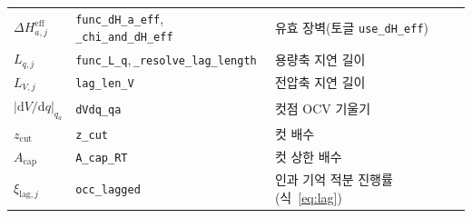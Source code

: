 \documentclass[11pt,a4paper]{article}
\newcommand{\dd}{\mathrm{d}}
\newcommand{\eff}{\mathrm{eff}}
\newcommand{\code}[1]{\texttt{#1}}
\begin{document}
\begin{longtable}{p{} p{} p{}}
$\Delta H_{a,j}^\eff$ & \code{func\_dH\_a\_eff},\,\code{\_chi\_and\_dH\_eff} & 유효 장벽(토글 \code{use\_dH\_eff}) \\
$L_{q,j}$ & \code{func\_L\_q},\,\code{\_resolve\_lag\_length} & 용량축 지연 길이 \\
$L_{V,j}$ & \code{lag\_len\_V} & 전압축 지연 길이 \\
$|\dd V/\dd q|_{q_a}$ & \code{dVdq\_qa} & 컷점 OCV 기울기 \\
$z_\mathrm{cut}$ & \code{z\_cut} & 컷 배수 \\
$A_\mathrm{cap}$ & \code{A\_cap\_RT} & 컷 상한 배수 \\
$\xi_{\mathrm{lag},j}$ & \code{occ\_lagged} & 인과 기억 적분 진행률(식~\eqref{eq:lag}) \\
\bottomrule
\end{longtable}
\end{document}
